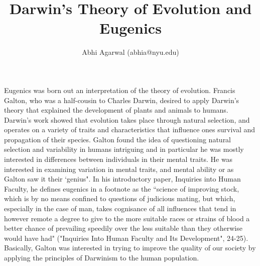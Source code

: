 \documentclass[11pt, oneside]{article}
\title{Darwin's Theory of Evolution and Eugenics}
\author{Abhi Agarwal (abhia@nyu.edu)}
\date{}
\begin{document}
\maketitle

\par 



\par 
Eugenics was born out an interpretation of the theory of evolution. Francis Galton, who was a half-cousin to Charles Darwin, desired to apply Darwin's theory that explained the development of plants and animals to humans. Darwin's work showed that evolution takes place through natural selection, and operates on a variety of traits and characteristics that influence ones survival and propagation of their species. 
Galton found the idea of questioning natural selection and variability in humans intriguing and in particular he was mostly interested in differences between individuals in their mental traits. He was interested in examining variation in mental traits, and mental ability or as Galton saw it their `genius". 
In his introductory paper, Inquiries into Human Faculty, he defines eugenics in a footnote as the ``science of improving stock, which is by no means confined to questions of judicious mating, but which, especially in the case of man, takes cognisance of all influences that tend in however remote a degree to give to the more suitable races or strains of blood a better chance of prevailing speedily over the less suitable than they otherwise would have had" ("Inquiries Into Human Faculty and Its Development", 24-25).
Basically, Galton was interested in trying to improve the quality of our society by applying the principles of Darwinism to the human population. 
\end{document}
